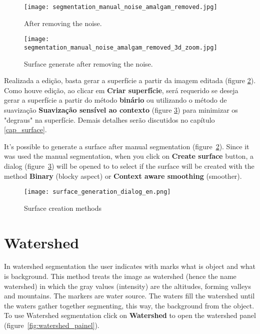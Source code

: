 \begin{figure}[!htb]
\centering
\texttt{[image: segmentation\_manual\_noise\_amalgam\_removed.jpg]}
\caption{After removing the noise.}
\label{fig:editor_amalgaman}
\end{figure}

\begin{figure}[!htb]
\centering
\texttt{[image: segmentation\_manual\_noise\_amalgam\_removed\_3d\_zoom.jpg]}
\caption{Surface generate after removing the noise.}
\label{fig:surface_edited_amalgaman}
\end{figure}

Realizada a edição, basta gerar a superfície a partir da imagem editada (figure \ref{fig:surface_edited_amalgaman}). Como houve edição, ao clicar em \textbf{Criar superfície}, será requerido se deseja gerar a superfície a partir do método \textbf{binário} ou utilizando o método de suavização \textbf{Suavização sensível ao contexto} (figure \ref{fig:new_surface_edited}) para minimizar os "degraus" na superfície.  Demais detalhes serão discutidos no capítulo \ref{cap_surface}.

It's possible to generate a surface after manual segmentation (figure~\ref{fig:surface_edited_amalgaman}). Since it was used the manual segmentation, when you click on \textbf{Create surface} button, a dialog (figure~\ref{fig:new_surface_edited}) will be opened to  to select if the surface will be created with the method \textbf{Binary} (blocky aspect) or \textbf{Context aware smoothing} (smoother).


\begin{figure}[!htb]
\centering
\texttt{[image: surface\_generation\_dialog\_en.png]}
\caption{Surface creation methods}
\label{fig:new_surface_edited}
\end{figure}


\section{Watershed}

In watershed segmentation the user indicates with marks what is object and what is background. This method treats the image as watershed (hence the name watershed) in which the gray values (intensity) are the altitudes, forming valleys and mountains. The markers are water source. The waters fill the watershed until the waters gather together segmenting, this way, the background from the object. To use Watershed segmentation click on \textbf{Watershed} to open the watershed panel (figure~\ref{fig:watershed_painel}).

